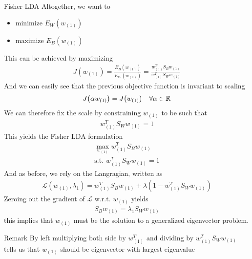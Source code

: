\begin{parag}{Fisher LDA}
    Altogether, we want to 
	\begin{itemize}
	    \item minimize $E_W\left(w_{\left(1\right)}\right)$
	    \item maximize $E_B\left(w_{\left(1\right)}\right)$
	\end{itemize}
	This can be achieved by maximizing 
	\begin{align*} 
		J\left(w_{\left(1\right)}\right) = \frac{E_B\left(w_{\left(1\right)}\right)}{E_W\left(w_{\left(1\right)}\right)} = \frac{w_{\left(1\right)}^{T}S_Bw_{\left(1\right)}}{w_{\left(1\right)}^{T}S_Ww_{\left(1\right)}}
	\end{align*}
	And we can easily see that the previous objective function is invariant to scaling 
	\begin{align*} 
		J\left(\alpha w_{\left(1\right)}\right) =  J\left(w_{\left(1\right)}\right) \mathspace \forall \alpha \in \mathbb{R}
	\end{align*}
	We can therefore fix the scale by constraining $w_{\left(1\right)}$ to be such that 
	\begin{align*} 
		w_{\left(1\right)}^{T}S_Ww_{\left(1\right)} = 1
	\end{align*}
	This yields the Fisher LDA formulation 
	\begin{align*} 
		\max_{w_{\left(1\right)}}w_{\left(1\right)}^{T}S_Bw_{\left(1\right)}\\
		\text{s.t. } w_{\left(1\right)}^{T}S_W w_{\left(1\right)} = 1
	\end{align*}
	And as before, we rely on the Langragian, written as 
	\begin{align*} 
		\mathcal{L}\left(w_{\left(1\right)}, \lambda_1\right) = w_{\left(1\right)}^{T}S_Bw_{\left(1\right)} + \lambda\left(1 - w_{\left(1\right)}^{T}S_Ww_{\left(1\right)}\right)
	\end{align*}
	Zeroing out the gradient of $\mathcal{L}$ w.r.t. $w_{\left(1\right)}$ yields 
	\begin{align*} 
		S_B w_{\left(1\right)} =  \lambda_1 S_W w_{\left(1\right)}
	\end{align*}
	this implies that $w_{\left(1\right)}$ must be the solution to a generalized eigenvector problem.
	\begin{subparag}{Remark}
	    By left multiplying both side by $w_{\left(1\right)}^{T}$ and dividing by $w_{\left(1\right)}^{T}S_Ww_{\left(1\right)}$ tells us that $w_{\left(1\right)}$ should be eigenvector with largest eigenvalue
	\end{subparag}
\end{parag}



